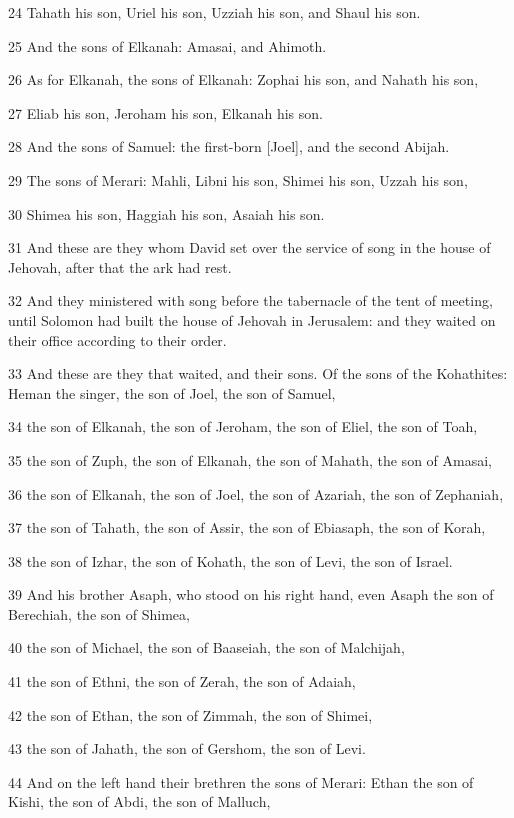\par 24 Tahath his son, Uriel his son, Uzziah his son, and Shaul his son.
\par 25 And the sons of Elkanah: Amasai, and Ahimoth.
\par 26 As for Elkanah, the sons of Elkanah: Zophai his son, and Nahath his son,
\par 27 Eliab his son, Jeroham his son, Elkanah his son.
\par 28 And the sons of Samuel: the first-born [Joel], and the second Abijah.
\par 29 The sons of Merari: Mahli, Libni his son, Shimei his son, Uzzah his son,
\par 30 Shimea his son, Haggiah his son, Asaiah his son.
\par 31 And these are they whom David set over the service of song in the house of Jehovah, after that the ark had rest.
\par 32 And they ministered with song before the tabernacle of the tent of meeting, until Solomon had built the house of Jehovah in Jerusalem: and they waited on their office according to their order.
\par 33 And these are they that waited, and their sons. Of the sons of the Kohathites: Heman the singer, the son of Joel, the son of Samuel,
\par 34 the son of Elkanah, the son of Jeroham, the son of Eliel, the son of Toah,
\par 35 the son of Zuph, the son of Elkanah, the son of Mahath, the son of Amasai,
\par 36 the son of Elkanah, the son of Joel, the son of Azariah, the son of Zephaniah,
\par 37 the son of Tahath, the son of Assir, the son of Ebiasaph, the son of Korah,
\par 38 the son of Izhar, the son of Kohath, the son of Levi, the son of Israel.
\par 39 And his brother Asaph, who stood on his right hand, even Asaph the son of Berechiah, the son of Shimea,
\par 40 the son of Michael, the son of Baaseiah, the son of Malchijah,
\par 41 the son of Ethni, the son of Zerah, the son of Adaiah,
\par 42 the son of Ethan, the son of Zimmah, the son of Shimei,
\par 43 the son of Jahath, the son of Gershom, the son of Levi.
\par 44 And on the left hand their brethren the sons of Merari: Ethan the son of Kishi, the son of Abdi, the son of Malluch,
